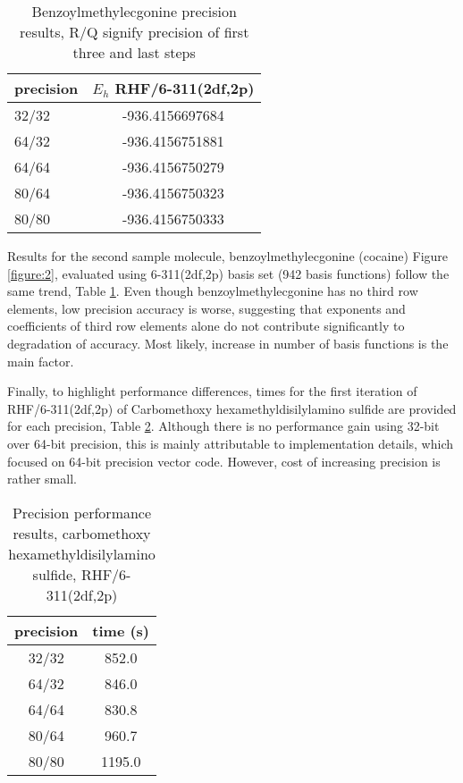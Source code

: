 \documentclass[12pt]{article}
\begin{document}
\begin {table}
\caption {Benzoylmethylecgonine precision results,
  R/Q signify precision of first three and last steps}
\label{table:2}
\begin{center}
  \begin{tabular}{| l | c |}
    \hline
    precision & $E_h$ RHF/6-311(2df,2p) \\ \hline
    32/32 & -936.4156697684 \\ \hline
    64/32 & -936.4156751881 \\ \hline
    64/64 & -936.4156750279 \\ \hline
    80/64 & -936.4156750323 \\ \hline
    80/80 & -936.4156750333 \\
    \hline
  \end{tabular}
\end{center}
  \end{table}


Results for the second sample molecule,
benzoylmethylecgonine (cocaine) Figure \ref{figure:2},
evaluated using 6-311(2df,2p) basis set (942 basis functions)
follow the same trend, Table \ref{table:2}.  
Even though benzoylmethylecgonine has no third row elements, low precision accuracy is worse, suggesting  that exponents and coefficients of third row elements alone do not contribute significantly to degradation of accuracy.  Most likely, increase in number of basis functions is the main factor.

Finally, to highlight performance differences, times for the first iteration of
RHF/6-311(2df,2p) of Carbomethoxy hexamethyldisilylamino sulfide are provided
for each precision, Table \ref{table:3}.
Although there is no performance gain using 32-bit over 64-bit precision, this is mainly attributable to implementation details, which focused on 
64-bit precision vector code.  However, cost of increasing precision is rather small.

\begin {table}
\caption {Precision performance results,
carbomethoxy hexamethyldisilylamino sulfide, RHF/6-311(2df,2p)}
\label {table:3}
\begin{center}
  \begin{tabular}{ | c | c | }
    \hline
    precision & time (s)\\ \hline
    32/32 & 852.0 \\ \hline
    64/32 & 846.0 \\ \hline
    64/64 & 830.8 \\ \hline
    80/64 & 960.7 \\ \hline
    80/80 & 1195.0 \\
    \hline
  \end{tabular}
\end{center}
\end{table}
\end{document}
